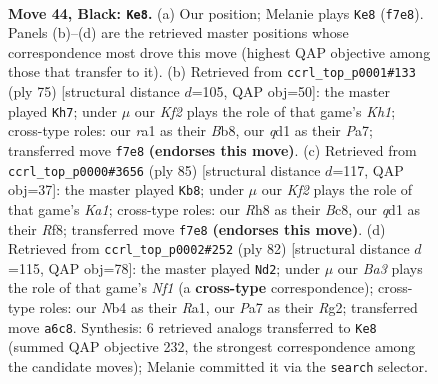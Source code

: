 \documentclass[11pt]{article}
\begin{document}
\clearpage

\begin{figure}[p]\centering
\begin{subfigure}{0.46\textwidth}\centering
\resizebox{\linewidth}{!}{%
\newchessgame
\chessboard[
  setfen={7r/p2r1k1p/bq1b2pP/1p1p1pP1/1n1P1P1K/1P2P3/4N3/R2Q1BNR b - - 35 44},
  showmover=false,
  pgfstyle=straightmove, color=movearrow, markmove={f7-e8}
]}
\caption{}
\end{subfigure}\hfill
\begin{subfigure}{0.46\textwidth}\centering
\resizebox{\linewidth}{!}{%
\newchessgame
\chessboard[
  setfen={1b1r3k/pb1q1p2/1p2pp1r/8/PP1PpN1P/4P1P1/3R1PN1/2RQ2K1 b - - 2 38},
  showmover=false,
  pgfstyle=straightmove, color=movearrow, markmove={h8-h7}
]}
\caption{}
\end{subfigure}
\\[4pt]
\begin{subfigure}{0.46\textwidth}\centering
\resizebox{\linewidth}{!}{%
\newchessgame
\chessboard[
  setfen={k1b2r1b/p2qpp2/3p4/P1pPP3/npP1QP1N/1N4R1/1P6/1KB5 b - - 26 43},
  showmover=false,
  pgfstyle=straightmove, color=movearrow, markmove={a8-b8}
]}
\caption{}
\end{subfigure}\hfill
\begin{subfigure}{0.46\textwidth}\centering
\resizebox{\linewidth}{!}{%
\newchessgame
\chessboard[
  setfen={2nq1r2/3b3r/kp2p2p/pn1p3P/2pP2P1/P1P1Q1BB/2P3R1/R4N1K w - - 5 42},
  showmover=false,
  pgfstyle=straightmove, color=movearrow, markmove={f1-d2}
]}
\caption{}
\end{subfigure}
\caption{\textbf{Move 44, Black: \texttt{Ke8}.} (a) Our position; Melanie plays \texttt{Ke8} (\texttt{f7e8}). Panels (b)--(d) are the retrieved master positions whose correspondence most drove this move (highest QAP objective among those that transfer to it). (b) Retrieved from \texttt{ccrl\_top\_p0001\#133} (ply 75) [structural distance $d$=105, QAP obj=50]: the master played \texttt{Kh7}; under $\mu$ our \emph{Kf2} plays the role of that game's \emph{Kh1}; cross-type roles: our \emph{r}a1 as their \emph{B}b8, our \emph{q}d1 as their \emph{P}a7; transferred move \texttt{f7e8} \textbf{(endorses this move)}. (c) Retrieved from \texttt{ccrl\_top\_p0000\#3656} (ply 85) [structural distance $d$=117, QAP obj=37]: the master played \texttt{Kb8}; under $\mu$ our \emph{Kf2} plays the role of that game's \emph{Ka1}; cross-type roles: our \emph{R}h8 as their \emph{B}c8, our \emph{q}d1 as their \emph{R}f8; transferred move \texttt{f7e8} \textbf{(endorses this move)}. (d) Retrieved from \texttt{ccrl\_top\_p0002\#252} (ply 82) [structural distance $d$=115, QAP obj=78]: the master played \texttt{Nd2}; under $\mu$ our \emph{Ba3} plays the role of that game's \emph{Nf1} (a \textbf{cross-type} correspondence); cross-type roles: our \emph{N}b4 as their \emph{R}a1, our \emph{P}a7 as their \emph{R}g2; transferred move \texttt{a6c8}. Synthesis: 6 retrieved analogs transferred to \texttt{Ke8} (summed QAP objective 232, the strongest correspondence among the candidate moves); Melanie committed it via the \texttt{search} selector.}
\label{fig:thought-m87}
\end{figure}
\end{document}
